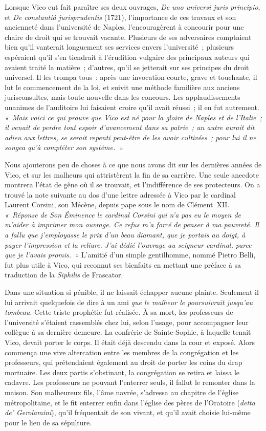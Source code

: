 \documentclass[french,twoside]{book} %
\begin{document}
Lorsque Vico eut fait paraître ses deux ouvrages, {\itshape De uno universi juris principio}, et {\itshape De constantiâ jurisprudentis} (1721), l’importance de ces travaux et son ancienneté dans l’université de Naples, l’encouragèrent à concourir pour une chaire de droit qui se trouvait vacante. Plusieurs de ses adversaires comptaient bien qu’il vanterait longuement ses services envers l’université ; plusieurs espéraient qu’il s’en tiendrait à l’érudition vulgaire des principaux auteurs qui avaient traité la matière ; d’autres, qu’il se jetterait sur ses principes du droit universel. Il les trompa tous : après une invocation courte, grave et touchante, il lut le commencement de la loi, et suivit une méthode familière aux anciens jurisconsultes, mais toute nouvelle dans les concours. Les applaudissements unanimes de l’auditoire lui faisaient croire qu’il avait réussi ;  il en fut autrement. \emph{« Mais voici ce qui prouve que Vico est né pour la gloire de Naples et de l’Italie ; il venait de perdre tout espoir d’avancement dans sa patrie ; un autre aurait dit adieu aux lettres, se serait repenti peut-être de les avoir cultivées ; pour lui il ne songea qu’à compléter son système. »}\par
Nous ajouterons peu de choses à ce que nous avons dit sur les dernières années de Vico, et sur les malheurs qui attristèrent la fin de sa carrière. Une seule anecdote montrera l’état de gêne où il se trouvait, et l’indifférence de ses protecteurs. On a trouvé la note suivante au dos d’une lettre adressée à Vico par le cardinal Laurent Corsini, son Mécène, depuis pape sous le nom de Clément XII. \emph{« Réponse de Son Éminence le cardinal Corsini qui n’a pas eu le moyen de m’aider à imprimer mon ouvrage. Ce refus m’a forcé de penser à ma pauvreté. Il a fallu que j’employasse le prix d’un beau diamant, que je portais au doigt, à payer l’impression et la reliure. J’ai dédié l’ouvrage au seigneur cardinal, parce que je l’avais promis. »} L’amitié d’un simple gentilhomme, nommé Pietro Belli, fut plus utile à Vico, qui reconnut ses bienfaits en mettant une préface à sa traduction de la {\itshape Siphilis} de Frascator.\par
Dans une situation si pénible, il ne laissait échapper aucune plainte. Seulement il lui arrivait quelquefois de dire à un ami {\itshape que le malheur le poursuivrait jusqu’au tombeau}. Cette triste prophétie fut réalisée. À sa mort, les professeurs de l’université s’étaient rassemblés chez lui, selon l’usage, pour accompagner leur collègue à sa dernière demeure. La confrérie de Sainte-Sophie, à laquelle tenait Vico, devait porter le corps. Il était déjà descendu dans la cour et exposé. Alors commença une vive altercation entre les membres de la congrégation et les professeurs, qui prétendaient également au droit de porter les coins du drap mortuaire. Les deux partis s’obstinant, la congrégation se retira et laissa le cadavre. Les professeurs ne pouvant l’enterrer seuls, il fallut le remonter dans la maison. Son malheureux fils, l’âme navrée, s’adressa au chapitre de l’église métropolitaine, et le fit enterrer enfin dans l’église des pères de l’Oratoire ({\itshape detta de’ Gerolamini}),  qu’il fréquentait de son vivant, et qu’il avait choisie lui-même pour le lieu de sa sépulture.\par
\end{document}
